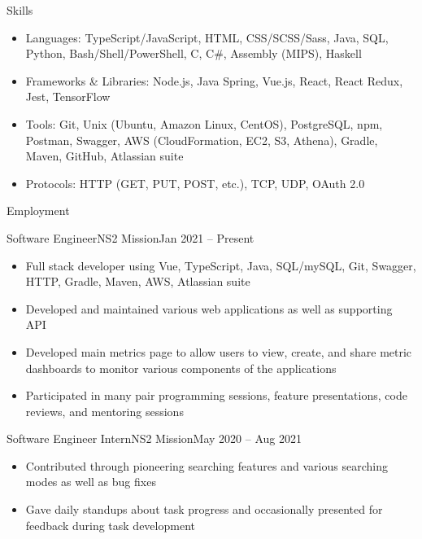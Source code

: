 \documentclass[]{mcdowellcv}
\begin{document}
	\makeheader
	
	\begin{cvsection}{Skills}
		\begin{cvsubsection}{}{}{}	
			\begin{itemize}
				\item Languages: TypeScript/JavaScript, HTML, CSS/SCSS/Sass, Java, SQL, Python, Bash/Shell/PowerShell, C, C\#, Assembly (MIPS), Haskell
				\item Frameworks \& Libraries: Node.js, Java Spring, Vue.js, React, React Redux, Jest, TensorFlow
				\item Tools: Git, Unix (Ubuntu, Amazon Linux, CentOS), PostgreSQL, npm, Postman, Swagger, AWS (CloudFormation, EC2, S3, Athena), Gradle, Maven, GitHub, Atlassian suite
				\item Protocols: HTTP (GET, PUT, POST, etc.), TCP, UDP, OAuth 2.0
			\end{itemize}
		\end{cvsubsection}
	\end{cvsection}

	\begin{cvsection}{Employment}
		\begin{cvsubsection}{Software Engineer}{NS2 Mission}{Jan 2021 -- Present}	
			\begin{itemize}
				\item Full stack developer using Vue, TypeScript, Java, SQL/mySQL, Git, Swagger, HTTP, Gradle, Maven, AWS, Atlassian suite
				\item Developed and maintained various web applications as well as supporting API
				\item Developed main metrics page to allow users to view, create, and share metric dashboards to monitor various components of the applications
				\item Participated in many pair programming sessions, feature presentations, code reviews, and mentoring sessions
			\end{itemize}
		\end{cvsubsection}

		\begin{cvsubsection}{Software Engineer Intern}{NS2 Mission}{May 2020 -- Aug 2021}	
			\begin{itemize}
				\item Contributed through pioneering searching features and various searching modes as well as bug fixes
				\item Gave daily standups about task progress and occasionally presented for feedback during task development
			\end{itemize}
		\end{cvsubsection}
	\end{cvsection}
	
\end{document}
